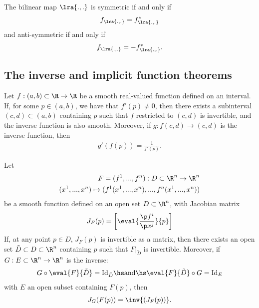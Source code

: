 \documentclass{article}
\begin{document}
\begin{lemma}
	The bilinear map $\lra{.,.}$ is symmetric if and only if
	\begin{align*}
		f_{\lra{.,.}}=f_{\lra{.,.}}^*
	\end{align*}
	and anti-symmetric if and only if
	\begin{align*}
		f_{\lra{.,.}}=-f_{\lra{.,.}}^*.
	\end{align*}
\end{lemma}


\subsection{The inverse and implicit function theorems}

\begin{theorem}
	Let $f:(a,b)\subset \R \to \R$ be a smooth real-valued function defined on an
	interval. If, for some $p\in(a,b)$, we have that $f'(p)\not=0$, then there exists
	a subinterval $(c,d)\subset(a,b)$ containing $p$ such that $f$ restricted to $(c,d)$
	is invertible, and the inverse function is also smooth. Moreover, if
	$g:f(c,d)\to(c,d)$ is the inverse function, then
	\begin{align*}
		g'(f(p))=\frac{1}{f'(p)}.
	\end{align*}
\end{theorem}

\begin{theorem}
	Let
	\begin{align*}
		F = (f^1,...,f^n):D\subset \R^n\to\R^n \\
		(x^1,...,x^n)\mapsto (f^1(x^1,...,x^n), ..., f^n(x^1,...,x^n))
	\end{align*}
	be a smooth function defined on an open set $D\subset\R^n$, with Jacobian matrix
	\begin{align*}
		J_F(p)=\left[\eval{\frac{\p f^i}{\p x^j}}{p}\right]
	\end{align*}
	If, at any point $p\in D$, $J_F(p)$ is invertible as a matrix, then there exists
	an open set $\tilde D\subset D\subset \R^n$ containing $p$ such that $F|_{\tilde D}$
	is invertible.
	Moreover, if $G:E\subset\R^n\to \R^n$ is the inverse:
	\begin{align*}
		G\circ \eval{F}{\tilde D}=\text{Id}_{\tilde D} \hs\text{and}\hs \eval{F}{\tilde D}\circ G=\text{Id}_E
	\end{align*}
	with $E$ an open subset containing $F(p)$, then
	\begin{align*}
		J_G(F(p))=\inv{(J_F(p))}.
	\end{align*}
\end{theorem}
\end{document}
